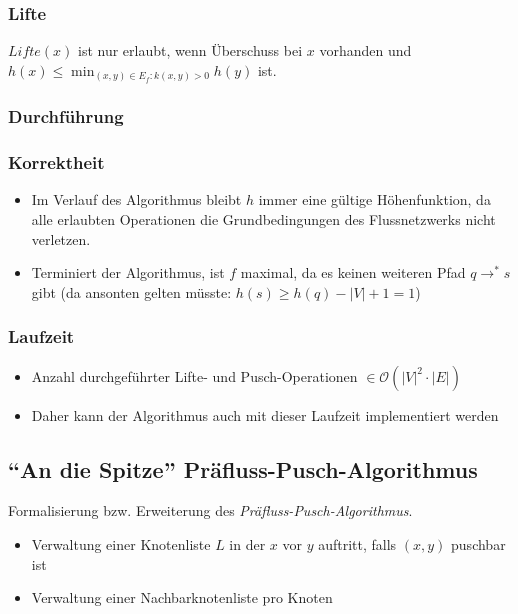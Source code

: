 \subsubsection{Lifte}
\(Lifte(x)\) ist nur erlaubt, wenn Überschuss bei \(x\) vorhanden und \(h(x) \leq \min_{(x,y) \in E_f : k(x,y) > 0}{h(y)}\) ist.


\subsubsection{Durchführung}


\subsubsection{Korrektheit}
\begin{itemize}
	\item Im Verlauf des Algorithmus bleibt \(h\) immer eine gültige Höhenfunktion, da alle erlaubten Operationen die Grundbedingungen des Flussnetzwerks nicht verletzen.
	\item Terminiert der Algorithmus, ist \(f\) maximal, da es keinen weiteren Pfad \(q \rightarrow^* s\) gibt (da ansonten gelten müsste: \(h(s) \geq h(q)-|V|+1=1\))
\end{itemize}

\subsubsection{Laufzeit}
\begin{itemize}
	\item Anzahl durchgeführter Lifte- und Pusch-Operationen \(\in \mathcal{O}(|V|^2 \cdot |E|)\)
	\item Daher kann der Algorithmus auch mit dieser Laufzeit implementiert werden
\end{itemize}


\subsection{"`An die Spitze"' Präfluss-Pusch-Algorithmus}
Formalisierung bzw. Erweiterung des \textit{Präfluss-Pusch-Algorithmus}.
\begin{itemize}
	\item Verwaltung einer Knotenliste \(L\) in der \(x\) vor \(y\) auftritt, falls \((x,y)\) puschbar ist
	\item Verwaltung einer Nachbarknotenliste pro Knoten
\end{itemize}

\text{}\\


